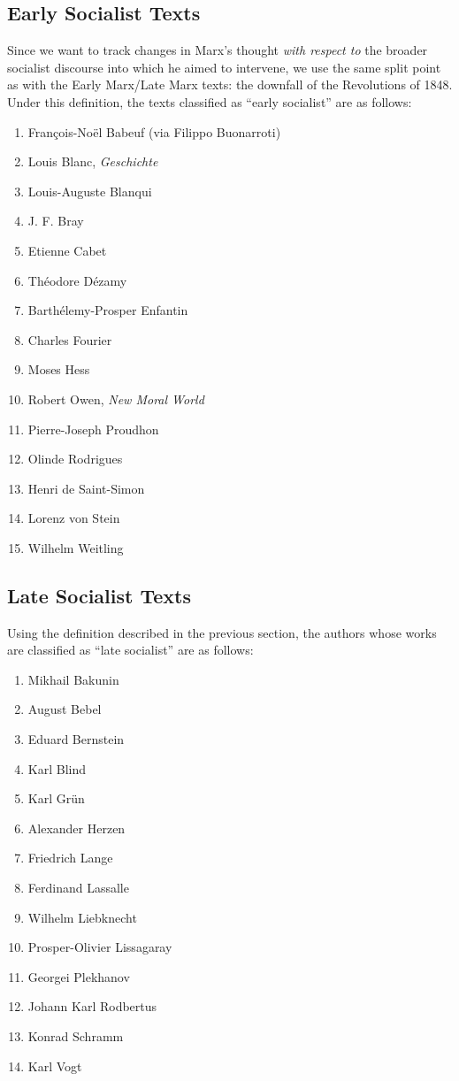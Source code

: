 \subsection{Early Socialist Texts}

Since we want to track changes in Marx's thought \textit{with respect to} the broader socialist discourse into which he aimed to intervene, we use the same split point as with the Early Marx/Late Marx texts: the downfall of the Revolutions of 1848. Under this definition, the texts classified as ``early socialist'' are as follows:

\begin{enumerate}
    \item François-Noël Babeuf (via Filippo Buonarroti)
    \item Louis Blanc, \textit{Geschichte}
    \item Louis-Auguste Blanqui
    \item J. F. Bray
    \item Etienne Cabet
    \item Théodore Dézamy
    \item Barthélemy-Prosper Enfantin
    \item Charles Fourier
    \item Moses Hess
    \item Robert Owen, \textit{New Moral World}
    \item Pierre-Joseph Proudhon
    \item Olinde Rodrigues
    \item Henri de Saint-Simon
    \item Lorenz von Stein
    \item Wilhelm Weitling
\end{enumerate}

\subsection{Late Socialist Texts}

Using the definition described in the previous section, the authors whose works are classified as ``late socialist'' are as follows:

\begin{enumerate}
    \item Mikhail Bakunin
    \item August Bebel
    \item Eduard Bernstein
    \item Karl Blind
    \item Karl Grün
    \item Alexander Herzen
    \item Friedrich Lange
    \item Ferdinand Lassalle
    \item Wilhelm Liebknecht
    \item Prosper-Olivier Lissagaray
    \item Georgei Plekhanov
    \item Johann Karl Rodbertus
    \item Konrad Schramm
    \item Karl Vogt
\end{enumerate}

